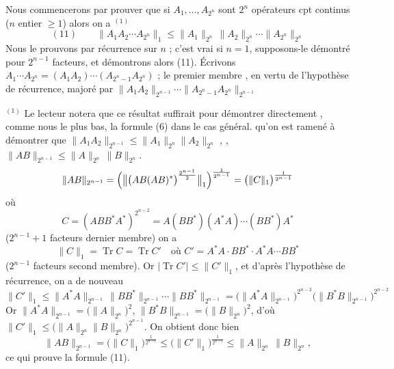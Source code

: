 \documentclass[11pt,a4paper]{article}
\begin{document}
Nous commencerons par prouver que si $A_1, \ldots, A_{2^n}$ sont $2^n$ opérateurs cpt continus ($n$ entier $\geq 1$) alors on a ${}^{(1)}$
\[
  (11)\qquad \|A_1 A_2 \cdots A_{2^n}\|_1 \leq \|A_1\|_{2^n}\, \|A_2\|_{2^n} \cdots \|A_{2^n}\|_{2^n}
\]
 Nous le prouvons par récurrence sur $n$ ; c'est vrai si $n = 1$,   supposons-le démontré pour $2^{n-1}$ facteurs, et démontrons alors (11). Écrivons $A_1 \cdots A_{2^n} = (A_1 A_2) \cdots (A_{2^n - 1} A_{2^n})$ ; le premier membre , en vertu de l'hypothèse de récurrence, majoré par $\|A_1 A_2\|_{2^{n-1}} \cdots \|A_{2^n - 1} A_{2^n}\|_{2^{n-1}}$

 ${}^{(1)}$ Le lecteur notera que ce résultat suffirait pour démontrer  directement , comme nous le  plus bas, la formule (6) dans le cas général.
  qu'on est ramené à démontrer    que $\|A_1 A_2\|_{2^{n-1}} \leq \|A_1\|_{2^n} \|A_2\|_{2^n}$ ,   , $\|AB\|_{2^{n-1}} \leq \|A\|_{2^n}\, \|B\|_{2^n}$.   \ill{}
\[
  \|AB\|_{2^{n-1}} = \Bigl(\bigl\|\bigl(AB(AB)^*\bigr)^{\frac{2^{n-1}}{2}}\bigr\|_1\Bigr)^{\frac{1}{2^{n-1}}} = \bigl(\|C\|_1\bigr)^{\frac{1}{2^{n-1}}}
\]
où
\[
  C = (ABB^*A^*)^{2^{n-2}} = A(BB^*)(A^*A)\cdots(BB^*)A^*
\]
($2^{n-1} + 1$ facteurs  dernier membre)  on a
\[
  \|C\|_1 = \operatorname{Tr} C = \operatorname{Tr} C' \quad \text{où } C' = A^*A \cdot BB^* \cdot A^*A \cdots BB^*
\]
  ($2^{n-1}$ facteurs  second membre). Or $|\operatorname{Tr} C'| \leq \|C'\|_1$, et d'après l'hypothèse de récurrence, on a de nouveau
\[
  \|C'\|_1 \leq \|A^*A\|_{2^{n-1}}\, \|BB^*\|_{2^{n-1}} \cdots \|BB^*\|_{2^{n-1}} = \bigl(\|A^*A\|_{2^{n-1}}\bigr)^{2^{n-2}} \bigl(\|B^*B\|_{2^{n-1}}\bigr)^{2^{n-2}}
\]
Or $\|A^*A\|_{2^{n-1}} = \bigl(\|A\|_{2^n}\bigr)^2$, $\|B^*B\|_{2^{n-1}} = \bigl(\|B\|_{2^n}\bigr)^2$, d'où $\|C'\|_1 \leq \bigl(\|A\|_{2^n} \|B\|_{2^n}\bigr)^{2^{n-1}}$. On obtient donc bien
\[
  \|AB\|_{2^{n-1}} = \bigl(\|C\|_1\bigr)^{\frac{1}{2^{n-1}}} \leq \bigl(\|C'\|_1\bigr)^{\frac{1}{2^{n-1}}} \leq \|A\|_{2^n}\, \|B\|_{2^n},
\]
ce qui prouve la formule (11).
\end{document}
